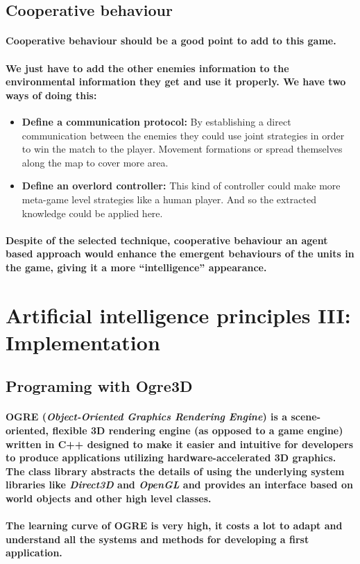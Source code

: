 \documentclass[a4paper,10pt]{article}
\newcommand{\p}[1]{\paragraph{\indent\textnormal{#1}}}
\begin{document}
  \subsection{Cooperative behaviour}

      \p{Cooperative behaviour should be a good point to add to this game.}
      
      \p{We just have to add the other enemies information to the environmental information they get and use it properly. We have two ways of doing this:}

	\begin{itemize}
	 \item \textbf{Define a communication protocol:} By establishing a direct communication between the enemies they could use joint strategies in order to win the match to the player. Movement formations or spread themselves along the map to cover more area.
	 \item \textbf{Define an overlord controller:} This kind of controller could make more meta-game level strategies like a human player. And so the extracted knowledge could be applied here.
	\end{itemize}

      \p{Despite of the selected technique, cooperative behaviour an agent based approach would enhance the emergent behaviours of the units in the game, giving it a more ``intelligence'' appearance.}

\newpage
\section{Artificial intelligence principles III: Implementation}

  \subsection{Programing with Ogre3D}

    \p{\textbf{OGRE} (\textit{Object-Oriented Graphics Rendering Engine}) is a scene-oriented, flexible 3D rendering engine (as opposed to a game engine) written in \textbf{C++} designed to make it easier and intuitive for developers to produce applications utilizing hardware-accelerated 3D graphics. The class library abstracts the details of using the underlying system libraries like \textit{Direct3D} and \textit{OpenGL} and provides an interface based on world objects and other high level classes.}

    \p{The learning curve of OGRE is very high, it costs a lot to adapt and understand all the systems and methods for developing a first application.}
\end{document}
